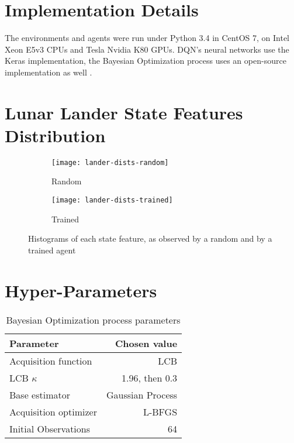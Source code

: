 \documentclass{article}
\begin{document}
\newpage



\appendix

\section{Implementation Details}
The environments and agents were run under Python 3.4 in CentOS 7, on Intel Xeon E5v3 CPUs and Tesla Nvidia K80 GPUs. DQN's neural networks use the Keras \cite{lib-keras} implementation, the Bayesian Optimization process uses an open-source implementation as well \cite{lib-skopt}.

\newpage
\section{Lunar Lander State Features Distribution}
\label{apx:distr}

\begin{figure}[h]

\begin{subfigure}[t]{0.45\linewidth}
  \texttt{[image: lander-dists-random]}
  \caption{Random}
\end{subfigure}\hfill %
\begin{subfigure}[t]{0.45\linewidth}
  \texttt{[image: lander-dists-trained]}
  \caption{Trained}
\end{subfigure}

  \caption{Histograms of each state feature, as observed by a random and by a trained agent}
\end{figure}

\section{Hyper-Parameters}
\label{apx:params}
\tiny

\begin{table}[!hb]
\centering
\caption{Bayesian Optimization process parameters}
 \label{tab:bayopt-params}
 
\begin{tabular}{lr}
Parameter & Chosen value \\
\midrule
Acquisition function        & LCB            \\
 LCB $\kappa$              & 1.96, then 0.3  \\
 Base estimator  & Gaussian Process \\
Acquisition optimizer  & L-BFGS \\
Initial Observations & 64
\end{tabular}
\end{table}
\end{document}
